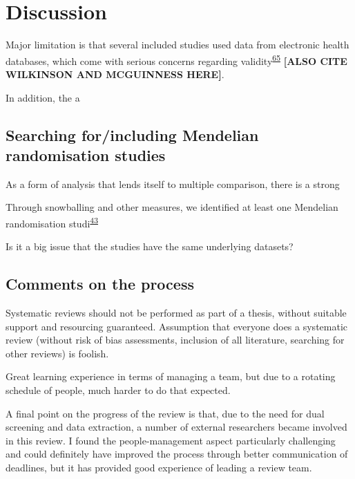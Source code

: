 \documentclass[a4paper, twoside]{templates/ociamthesis}
\begin{document}
\hypertarget{discussion-1}{%
\section{Discussion}\label{discussion-1}}

Major limitation is that several included studies used data from electronic health databases, which come with serious concerns regarding validity\textsuperscript{\protect\hyperlink{ref-hsieh2019}{65}} \textbf{{[}ALSO CITE WILKINSON AND MCGUINNESS HERE{]}}.

In addition, the a

\hypertarget{searching-forincluding-mendelian-randomisation-studies}{%
\subsection{Searching for/including Mendelian randomisation studies}\label{searching-forincluding-mendelian-randomisation-studies}}

As a form of analysis that lends itself to multiple comparison, there is a strong

Through snowballing and other measures, we identified at least one Mendelian randomisation studi\textsuperscript{\protect\hyperlink{ref-larsson2017b}{43}}

Is it a big issue that the studies have the same underlying datasets?

\hypertarget{comments-on-the-process}{%
\subsection{Comments on the process}\label{comments-on-the-process}}

Systematic reviews should not be performed as part of a thesis, without suitable support and resourcing guaranteed. Assumption that everyone does a systematic review (without risk of bias assessments, inclusion of all literature, searching for other reviews) is foolish.

Great learning experience in terms of managing a team, but due to a rotating schedule of people, much harder to do that expected.

A final point on the progress of the review is that, due to the need for dual screening and data extraction, a number of external researchers became involved in this review. I found the people-management aspect particularly challenging and could definitely have improved the process through better communication of deadlines, but it has provided good experience of leading a review team.
\end{document}

